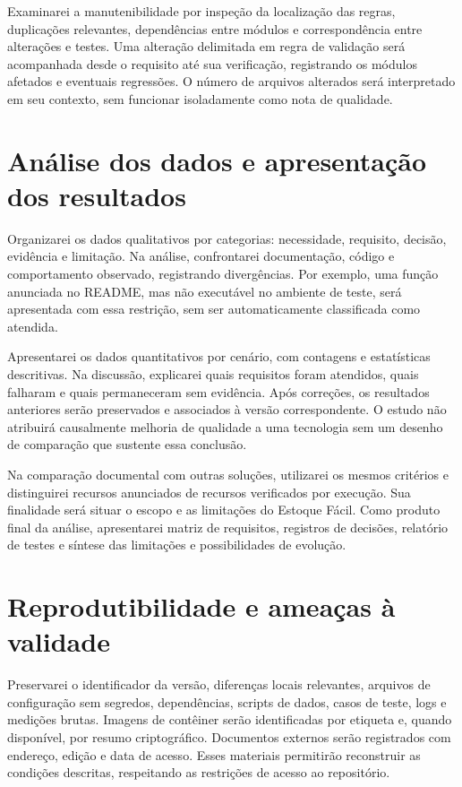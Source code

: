 Examinarei a manutenibilidade por inspeção da localização das regras, duplicações relevantes, dependências entre módulos e correspondência entre alterações e testes. Uma alteração delimitada em regra de validação será acompanhada desde o requisito até sua verificação, registrando os módulos afetados e eventuais regressões. O número de arquivos alterados será interpretado em seu contexto, sem funcionar isoladamente como nota de qualidade.

\section{Análise dos dados e apresentação dos resultados}

Organizarei os dados qualitativos por categorias: necessidade, requisito, decisão, evidência e limitação. Na análise, confrontarei documentação, código e comportamento observado, registrando divergências. Por exemplo, uma função anunciada no README, mas não executável no ambiente de teste, será apresentada com essa restrição, sem ser automaticamente classificada como atendida.

Apresentarei os dados quantitativos por cenário, com contagens e estatísticas descritivas. Na discussão, explicarei quais requisitos foram atendidos, quais falharam e quais permaneceram sem evidência. Após correções, os resultados anteriores serão preservados e associados à versão correspondente. O estudo não atribuirá causalmente melhoria de qualidade a uma tecnologia sem um desenho de comparação que sustente essa conclusão.

Na comparação documental com outras soluções, utilizarei os mesmos critérios e distinguirei recursos anunciados de recursos verificados por execução. Sua finalidade será situar o escopo e as limitações do Estoque Fácil. Como produto final da análise, apresentarei matriz de requisitos, registros de decisões, relatório de testes e síntese das limitações e possibilidades de evolução.

\section{Reprodutibilidade e ameaças à validade}

Preservarei o identificador da versão, diferenças locais relevantes, arquivos de configuração sem segredos, dependências, scripts de dados, casos de teste, logs e medições brutas. Imagens de contêiner serão identificadas por etiqueta e, quando disponível, por resumo criptográfico. Documentos externos serão registrados com endereço, edição e data de acesso. Esses materiais permitirão reconstruir as condições descritas, respeitando as restrições de acesso ao repositório.

